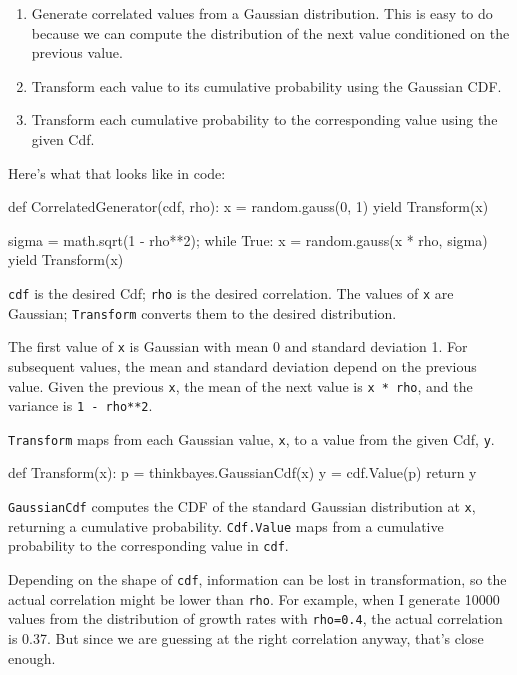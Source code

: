 \documentclass[12pt]{book}
\theoremstyle{exercise}
\begin{document}
\begin{enumerate}

\item Generate correlated values from a Gaussian distribution.
  This is easy to do because we can compute the distribution
  of the next value conditioned on the previous value.

\item Transform each value to its cumulative probability using
  the Gaussian CDF.

\item Transform each cumulative probability to the corresponding value
  using the given Cdf.

\end{enumerate}

Here's what that looks like in code:

\begin{code}
def CorrelatedGenerator(cdf, rho):
    x = random.gauss(0, 1)
    yield Transform(x)

    sigma = math.sqrt(1 - rho**2);    
    while True:
        x = random.gauss(x * rho, sigma)
        yield Transform(x)
\end{code}

{\tt cdf} is the desired Cdf; {\tt rho} is the desired correlation.
The values of {\tt x} are Gaussian; {\tt Transform} converts them
to the desired distribution.

The first value of {\tt x} is Gaussian with mean 0 and standard
deviation 1.  For subsequent values, the mean and standard deviation
depend on the previous value.  Given the previous {\tt x}, the mean of the
next value is {\tt x * rho}, and the variance is {\tt 1 - rho**2}.

{\tt Transform} maps from each
Gaussian value, {\tt x}, to a value from the given Cdf, {\tt y}.

\begin{code}
    def Transform(x):
        p = thinkbayes.GaussianCdf(x)
        y = cdf.Value(p)
        return y
\end{code}

{\tt GaussianCdf} computes the CDF of the standard Gaussian
distribution at {\tt x}, returning a cumulative probability.
{\tt Cdf.Value} maps from a cumulative probability to the
corresponding value in {\tt cdf}.

Depending on the shape of {\tt cdf}, information can
be lost in transformation, so the actual correlation might be
lower than {\tt rho}.  For example, when I generate
10000 values from the distribution of growth rates with
{\tt rho=0.4}, the actual correlation is 0.37.
But since we are guessing at the right correlation anyway,
that's close enough.
\end{document}
